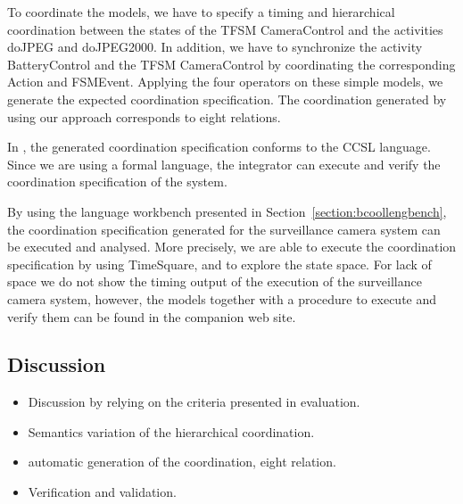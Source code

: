	To coordinate the models, we have to specify a timing and hierarchical coordination between the states of the TFSM CameraControl and the activities doJPEG and doJPEG2000. In addition, we have to synchronize the activity BatteryControl and the TFSM CameraControl by coordinating the corresponding Action and FSMEvent. Applying the four operators on these simple models, we generate the expected coordination specification. The coordination generated by using our approach corresponds to eight \ccsl relations.
	 
	In \bcool, the generated coordination specification conforms to the CCSL language. Since we are using a formal language, the integrator can execute and verify the coordination specification of the system.
	
	By using the language workbench presented in Section~\ref{section:bcoollengbench}, the coordination specification generated for the surveillance camera system can be executed and analysed. More precisely, we are able to execute the coordination specification by using TimeSquare, and to explore the state space. For lack of space we do not show the timing output of the execution of the surveillance camera system, however, the models together with a procedure to execute and verify them can be found in the companion web site.
	
	\subsection{Discussion}
	
	\begin{itemize}
		\item Discussion by relying on the criteria presented in evaluation.
		\item Semantics variation of the hierarchical coordination. 
		\item automatic generation of the coordination, eight relation.
		\item Verification and validation. 
	\end{itemize}